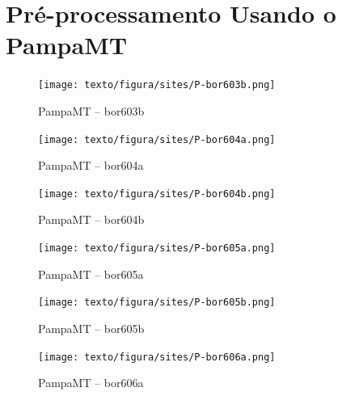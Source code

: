 \chapter{Pré-processamento Usando o PampaMT}
\label{ap-pampamt}
\begin{figure}[H]
        \caption{PampaMT -- bor603b}
            \begin{center}
                \texttt{[image: texto/figura/sites/P-bor603b.png]}
            \end{center}
    \end{figure}
    \begin{figure}[H]
        \caption{PampaMT -- bor604a}
            \begin{center}
                \texttt{[image: texto/figura/sites/P-bor604a.png]}
            \end{center}
    \end{figure}
    
    \begin{figure}[H]
        \caption{PampaMT -- bor604b}
            \begin{center}
                \texttt{[image: texto/figura/sites/P-bor604b.png]}
            \end{center}
    \end{figure}
    
    \begin{figure}[H]
        \caption{PampaMT -- bor605a}
            \begin{center}
                \texttt{[image: texto/figura/sites/P-bor605a.png]}
            \end{center}
    \end{figure}
    
    \begin{figure}[H]
        \caption{PampaMT -- bor605b}
            \begin{center}
                \texttt{[image: texto/figura/sites/P-bor605b.png]}
            \end{center}
    \end{figure}
    
    \begin{figure}[H]
        \caption{PampaMT -- bor606a}
            \begin{center}
                \texttt{[image: texto/figura/sites/P-bor606a.png]}
            \end{center}
    \end{figure}
    
